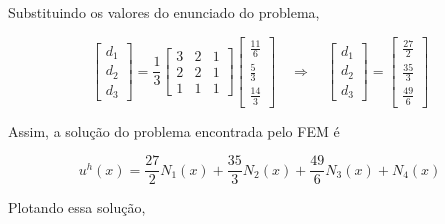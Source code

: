 \documentclass[12pt]{scrartcl}
\newcommand{\logo}{\quad \Rightarrow \quad}
\begin{document}
\endgroup

Substituindo os valores do enunciado do problema, 

\begingroup
\renewcommand*{\arraystretch}{2}

\[
    \begin{bmatrix}
        d_1    \\
        d_2    \\
        d_3
    \end{bmatrix} =
    \frac{1}{3}
    \begin{bmatrix}
        3  & 2 & 1  \\
        2 & 2  & 1 \\
        1  & 1 & 1
    \end{bmatrix}
    \begin{bmatrix}
        \frac{11}{6} \\
        \frac{5}{3} \\
        \frac{14}{3} 
    \end{bmatrix}
    \logo
    \begin{bmatrix}
        d_1    \\
        d_2    \\
        d_3
    \end{bmatrix} =
    \begin{bmatrix}
        \frac{27}{2} \\
        \frac{35}{3} \\
        \frac{49}{6} 
    \end{bmatrix}
\]

\endgroup

Assim, a solução do problema encontrada pelo FEM é   

\[ \boxed{u^h(x) = \frac{27}{2}N_1(x) + \frac{35}{3}N_2(x) + \frac{49}{6}N_3(x) + N_{4}(x)}  \]

Plotando essa solução,
\end{document}
